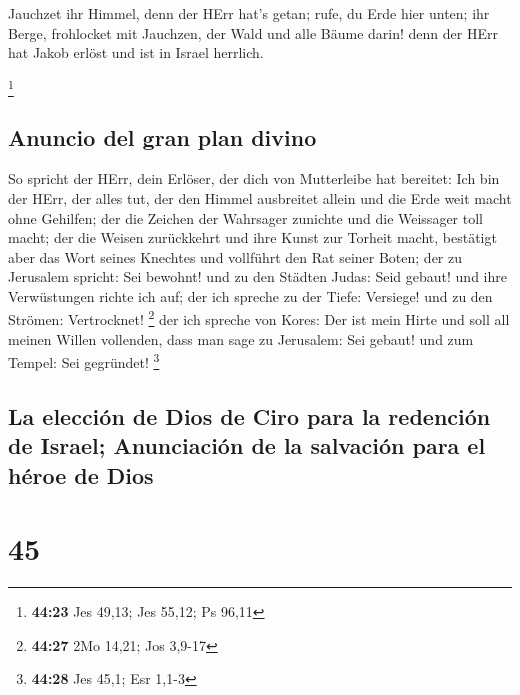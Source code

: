 Jauchzet ihr Himmel, denn der HErr hat's getan; rufe, du
Erde hier unten; ihr Berge, frohlocket mit Jauchzen, der Wald und alle
Bäume darin! denn der HErr hat Jakob erlöst und ist in Israel herrlich.

\footnote{\textbf{44:23} Jes 49,13; Jes 55,12; Ps 96,11}

\hypertarget{anuncio-del-gran-plan-divino}{%
\subsection{Anuncio del gran plan
divino}\label{anuncio-del-gran-plan-divino}}

 So spricht der HErr, dein Erlöser, der dich von
Mutterleibe hat bereitet: Ich bin der HErr, der alles tut, der den
Himmel ausbreitet allein und die Erde weit macht ohne Gehilfen;
 der die Zeichen der Wahrsager zunichte und die Weissager
toll macht; der die Weisen zurückkehrt und ihre Kunst zur Torheit macht,
 bestätigt aber das Wort seines Knechtes und vollführt
den Rat seiner Boten; der zu Jerusalem spricht: Sei bewohnt! und zu den
Städten Judas: Seid gebaut! und ihre Verwüstungen richte ich auf;
 der ich spreche zu der Tiefe: Versiege! und zu den
Strömen: Vertrocknet! \footnote{\textbf{44:27} 2Mo 14,21; Jos 3,9-17}
 der ich spreche von Kores: Der ist mein Hirte und soll
all meinen Willen vollenden, dass man sage zu Jerusalem: Sei gebaut! und
zum Tempel: Sei gegründet! \footnote{\textbf{44:28} Jes 45,1; Esr 1,1-3}

\hypertarget{la-elecciuxf3n-de-dios-de-ciro-para-la-redenciuxf3n-de-israel-anunciaciuxf3n-de-la-salvaciuxf3n-para-el-huxe9roe-de-dios}{%
\subsection{La elección de Dios de Ciro para la redención de Israel;
Anunciación de la salvación para el héroe de
Dios}\label{la-elecciuxf3n-de-dios-de-ciro-para-la-redenciuxf3n-de-israel-anunciaciuxf3n-de-la-salvaciuxf3n-para-el-huxe9roe-de-dios}}

\hypertarget{section-44}{%
\section{45}\label{section-44}}

